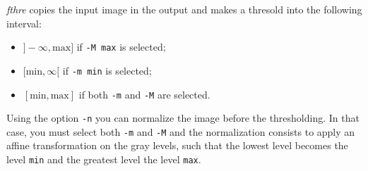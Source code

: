 {\em fthre} copies the input image in the output and makes a thresold 
into the following interval:
\begin{itemize}
\item $]-\infty, \mbox{max}]$ if \verb+-M max+ is selected;
\item $[\mbox{min}, \infty[$ if \verb+-m min+ is selected;
\item $[\mbox{min}, \mbox{max}]$ if both \verb+-m+ and \verb+-M+ are selected.
\end{itemize}

Using the option \verb+-n+ you can normalize the image before the
thresholding. 
In that case, you must select both \verb+-m+ and \verb+-M+ and the
normalization consists to apply an affine transformation on the gray levels,
such that the lowest level becomes the level \verb+min+ and the greatest
level the level \verb+max+.

